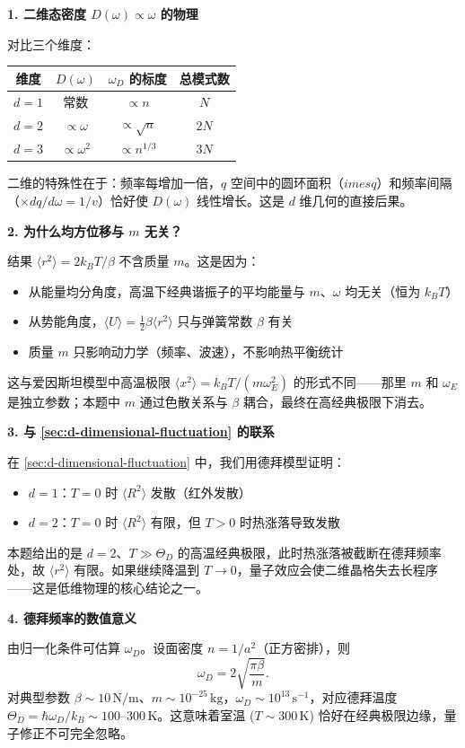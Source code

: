 \begin{insightbox}[物理图像与概念深化]
\textbf{1. 二维态密度 $D(\omega)\propto\omega$ 的物理}

对比三个维度：
\begin{center}
\begin{tabular}{cccc}
\toprule
维度 & $D(\omega)$ & $\omega_D$ 的标度 & 总模式数 \\
\midrule
$d=1$ & 常数 & $\propto n$ & $N$ \\
$d=2$ & $\propto\omega$ & $\propto\sqrt{n}$ & $2N$ \\
$d=3$ & $\propto\omega^2$ & $\propto n^{1/3}$ & $3N$ \\
\bottomrule
\end{tabular}
\end{center}

二维的特殊性在于：频率每增加一倍，$q$ 空间中的圆环面积（$	imes q$）和频率间隔（$\times dq/d\omega=1/v$）恰好使 $D(\omega)$ 线性增长。这是 $d$ 维几何的直接后果。

\textbf{2. 为什么均方位移与 $m$ 无关？}

结果 $\langle r^2\rangle=2k_BT/\beta$ 不含质量 $m$。这是因为：
\begin{itemize}
    \item 从能量均分角度，高温下经典谐振子的平均能量与 $m$、$\omega$ 均无关（恒为 $k_BT$）
    \item 从势能角度，$\langle U\rangle=\frac12\beta\langle r^2\rangle$ 只与弹簧常数 $\beta$ 有关
    \item 质量 $m$ 只影响动力学（频率、波速），不影响热平衡统计
\end{itemize}
这与爱因斯坦模型中高温极限 $\langle x^2\rangle=k_BT/(m\omega_E^2)$ 的形式不同——那里 $m$ 和 $\omega_E$ 是独立参数；本题中 $m$ 通过色散关系与 $\beta$ 耦合，最终在高经典极限下消去。

\textbf{3. 与 \ref{sec:d-dimensional-fluctuation} 的联系}

在 \ref{sec:d-dimensional-fluctuation} 中，我们用德拜模型证明：
\begin{itemize}
    \item $d=1$：$T=0$ 时 $\langle R^2\rangle$ 发散（红外发散）
    \item $d=2$：$T=0$ 时 $\langle R^2\rangle$ 有限，但 $T>0$ 时热涨落导致发散
\end{itemize}
本题给出的是 $d=2$、$T\gg\Theta_D$ 的高温经典极限，此时热涨落被截断在德拜频率处，故 $\langle r^2\rangle$ 有限。如果继续降温到 $T\to0$，量子效应会使二维晶格失去长程序——这是低维物理的核心结论之一。

\textbf{4. 德拜频率的数值意义}

由归一化条件可估算 $\omega_D$。设面密度 $n=1/a^2$（正方密排），则
\begin{equation}
\omega_D = 2\sqrt{\frac{\pi\beta}{m}}.
\end{equation}
对典型参数 $\beta\sim10\,\mathrm{N/m}$、$m\sim10^{-25}\,\mathrm{kg}$，$\omega_D\sim10^{13}\,\mathrm{s^{-1}}$，对应德拜温度 $\Theta_D=\hbar\omega_D/k_B\sim100\text{--}300\,\mathrm{K}$。这意味着室温 ($T\sim300\,\mathrm{K}$) 恰好在经典极限边缘，量子修正不可完全忽略。
\end{insightbox}

